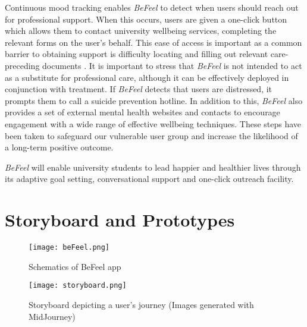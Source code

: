 \documentclass[acmsmall, screen, nonacm, 9pt, a4paper,top=2cm,bottom=2cm,left=1cm,right=1cm, marginparwidth=1cm]{acmart}
\begin{document}
Continuous mood tracking enables \emph{BeFeel} to detect when users should reach out for professional support. When this occurs, users are given a one-click button which allows them to contact university wellbeing services, completing the relevant forms on the user’s behalf. This ease of access is important as a common barrier to obtaining support is difficulty locating and filling out relevant care-preceding documents \cite{Rosenthal2008MentalStudents}. It is important to stress that \emph{BeFeel} is not intended to act as a substitute for professional care, although it can be effectively deployed in conjunction with treatment. If \emph{BeFeel} detects that users are distressed, it prompts them to call a suicide prevention hotline. In addition to this, \emph{BeFeel} also provides a set of external mental health websites and contacts to encourage engagement with a wide range of effective wellbeing techniques. These steps have been taken to safeguard our vulnerable user group and increase the likelihood of a long-term positive outcome.

\emph{BeFeel} will enable university students to lead happier and healthier lives through its adaptive goal setting, conversational support and one-click outreach facility.


\section{Storyboard and Prototypes}
\begin{figure}[H]
    \centering
    \texttt{[image: beFeel.png]}
    \caption{Schematics of BeFeel app}
    \label{fig:beFeel}
    
\end{figure}

\begin{figure}[H]
    \centering
    \texttt{[image: storyboard.png]}
    \caption{Storyboard depicting a user's journey (Images generated with MidJourney)}
    \label{fig:storyboard-main}
\end{figure}
\end{document}
